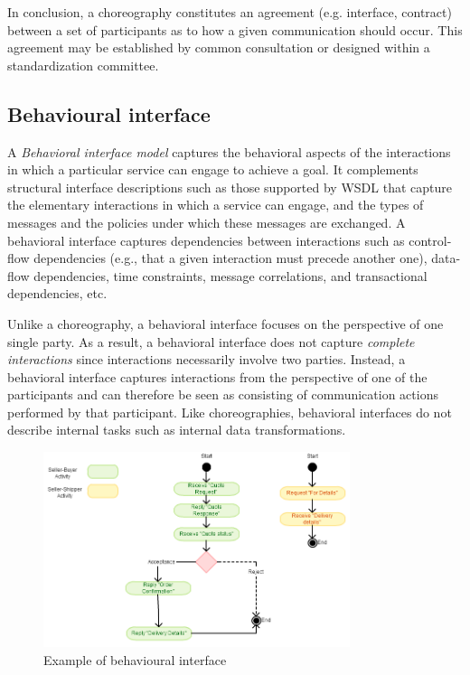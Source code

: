 In conclusion, a choreography constitutes an agreement (e.g. interface, contract) between a set of participants as to how a given communication should occur. This agreement may be established by common consultation or designed within a standardization committee.

\subsection{Behavioural interface}

A \textit{Behavioral interface model }captures the behavioral aspects of the interactions in which a particular service can engage to achieve a goal. It complements structural interface descriptions such as those supported by WSDL that capture the elementary interactions in which a service can engage, and the types of messages and the policies under which these messages are exchanged. A behavioral interface captures dependencies between interactions such as control-flow dependencies (e.g., that a given interaction must precede another one), data-flow dependencies, time constraints, message correlations, and transactional dependencies, etc.

Unlike a choreography, a behavioral interface focuses on the perspective of one single party. As a result, a behavioral interface does not capture \textit{complete interactions }since interactions necessarily involve two parties. Instead, a behavioral interface captures interactions from the perspective of one of the participants and can therefore be seen as consisting of communication actions performed by that participant. Like choreographies, behavioral interfaces do not describe internal tasks such as internal data transformations.

\begin{figure}
\centering
\includegraphics[width=0.8\textwidth]{resources/behav_interf_bsh.png}
\caption{Example of behavioural interface}
\label{fig:behavioural-interface}
\end{figure}

